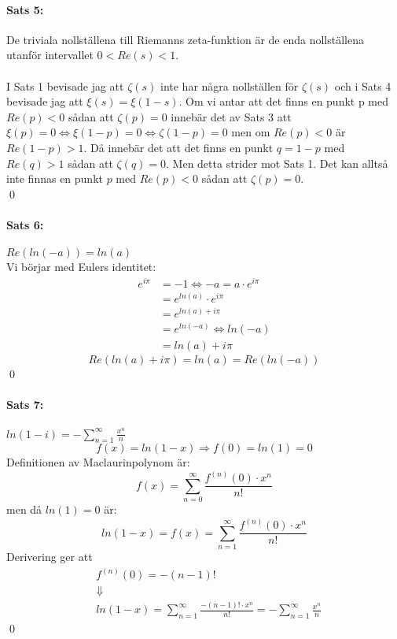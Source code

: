 \documentclass{article}%
\begin{document}
\paragraph{Sats 5:} De triviala nollställena till Riemanns zeta-funktion är de enda nollställena utanför intervallet $0 < Re(s) < 1$. \\
\\ %
I Sats 1 bevisade jag att $\zeta(s)$ inte har några nollställen för $\zeta(s)$ och i Sats 4 bevisade jag att $\xi(s) = \xi(1 - s)$.
Om vi antar att det finns en punkt p med $Re(p) < 0$ sådan att $\zeta(p) = 0$ innebär det av Sats 3 att $\xi(p) = 0 \Leftrightarrow
\xi(1 - p) = 0 \Leftrightarrow \zeta(1 - p) = 0$ men om $Re(p) < 0$ är $Re(1 - p) > 1$. Då innebär det att det finns en punkt
$q = 1 - p$ med $Re(q) > 1$ sådan att $\zeta(q) = 0$. Men detta strider mot Sats 1. Det kan alltså inte finnas en punkt $p$ med
$Re(p) < 0$ sådan att $\zeta(p) = 0$. \\
\hfill \qed %

\paragraph{Sats 6:} $Re(ln(-a)) = ln(a)$ \\
Vi börjar med Eulers identitet:
\begin{align*}
	e^{i\pi} &= -1 \Leftrightarrow -a = a \cdot e^{i\pi} \\
			 &= e^{ln(a)} \cdot e^{i\pi} \\
			 &= e^{ln(a) + i\pi} \\
			 &= e^{ln(-a)} \Leftrightarrow ln(-a) \\
			 &= ln(a) + i\pi 
\end{align*}
$$Re(ln(a) + i\pi) = ln(a) = Re(ln(-a))$$
\hfill \qed

\pagebreak

\paragraph{Sats 7:} $ln(1 - i) = - \sum\limits_{n = 1}^\infty \frac {x^n} n$
$$f(x) = ln(1 - x) \Rightarrow f(0) = ln(1) = 0$$
Definitionen av Maclaurinpolynom är:
$$f(x) = \sum_{n = 0}^\infty \frac {f^{(n)}(0) \cdot x^n} {n!}$$
men då $ln(1) = 0$ är:
$$ln(1 - x) = f(x) = \sum_{n = 1}^{\infty} \frac {f^{(n)}(0) \cdot x^n} {n!}$$
Derivering ger att
\begin{align*}
	&f^{(n)}(0) = -(n - 1)! \\
	&\Downarrow \\ 
	&ln(1 - x) = \sum_{n = 1}^\infty \frac {-(n - 1)! \cdot x^n} {n!} = - \sum_{n = 1}^\infty \frac {x^n} n
\end{align*}
\hfill \qed
\end{document}
